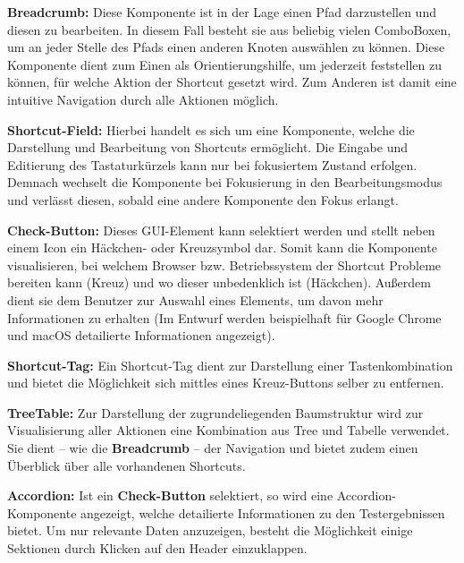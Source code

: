 \textbf{Breadcrumb:} Diese Komponente ist in der Lage einen Pfad darzustellen und diesen zu bearbeiten. In diesem Fall besteht sie aus beliebig vielen ComboBoxen, um an jeder Stelle des Pfads einen anderen Knoten auswählen zu können. Diese Komponente dient zum Einen als Orientierungshilfe, um jederzeit feststellen zu können, für welche Aktion der Shortcut gesetzt wird. Zum Anderen ist damit eine intuitive Navigation durch alle Aktionen möglich.

 \textbf{Shortcut-Field:} Hierbei handelt es sich um eine Komponente, welche die Darstellung und Bearbeitung von Shortcuts ermöglicht. Die Eingabe und Editierung des Tastaturkürzels kann nur bei fokusiertem Zustand erfolgen. Demnach wechselt die Komponente bei Fokusierung in den Bearbeitungsmodus und verlässt diesen, sobald eine andere Komponente den Fokus erlangt.

 \textbf{Check-Button:} Dieses GUI-Element kann selektiert werden und stellt neben einem Icon ein Häckchen- oder Kreuzsymbol dar. Somit kann die Komponente visualisieren, bei welchem Browser bzw. Betriebssystem der Shortcut Probleme bereiten kann (Kreuz) und wo dieser unbedenklich ist (Häckchen). Außerdem dient sie dem Benutzer zur Auswahl eines Elements, um davon mehr Informationen zu erhalten (Im Entwurf werden beispielhaft für Google Chrome und macOS detailierte Informationen angezeigt).

 \textbf{Shortcut-Tag:} Ein Shortcut-Tag dient zur Darstellung einer Tastenkombination und bietet die Möglichkeit sich mittles eines Kreuz-Buttons selber zu entfernen.

 \textbf{TreeTable:} Zur Darstellung der zugrundeliegenden Baumstruktur wird zur Visualisierung aller Aktionen eine Kombination aus Tree und Tabelle verwendet. Sie dient -- wie die \textbf{Breadcrumb} -- der Navigation und bietet zudem einen Überblick über alle vorhandenen Shortcuts.

 \textbf{Accordion:} Ist ein \textbf{Check-Button} selektiert, so wird eine Accordion-Komponente angezeigt, welche detailierte Informationen zu den Testergebnissen bietet. Um nur relevante Daten anzuzeigen, besteht die Möglichkeit einige Sektionen durch Klicken auf den Header einzuklappen.

